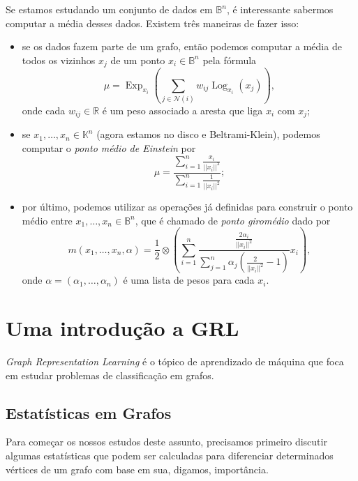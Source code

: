 \documentclass{article}
\DeclareMathOperator{\Exp}{Exp}
\DeclareMathOperator{\Log}{Log}
\begin{document}
Se estamos estudando um conjunto de dados em $\mathbb{B}^n$, é interessante sabermos computar a média desses dados. Existem três maneiras de fazer isso: \begin{itemize}
    \item se os dados fazem parte de um grafo, então podemos computar a média de todos os vizinhos $x_j$ de um ponto $x_i \in \mathbb{B}^n$ pela fórmula \begin{equation}
        \mu = \Exp_{x_i}\left(\sum_{j \in \mathcal{N}(i)} w_{ij} \Log_{x_i}(x_j)\right),
    \end{equation} onde cada $w_{ij} \in \mathbb{R}$ é um peso associado a aresta que liga $x_i$ com $x_j$;

    \item se $x_1, \dots, x_n \in \mathbb{K}^n$ (agora estamos no disco e Beltrami-Klein), podemos computar o \textit{ponto médio de Einstein} por \begin{equation}
        \mu = \frac{\sum_{i = 1}^n \frac{x_i}{||x_i||^2}}{\sum_{i = 1}^n \frac{1}{||x_i||^2}};
    \end{equation}

    \item por último, podemos utilizar as operações já definidas para construir o ponto médio entre $x_1, \dots, x_n \in \mathbb{B}^n$, que é chamado de \textit{ponto giromédio} dado por \begin{equation}
        m(x_1, \dots, x_n, \alpha) = \frac{1}{2} \otimes \left(\sum_{i = 1}^n \frac{\frac{2\alpha_i}{||x_i||^2}}{\sum_{j = 1}^n \alpha_j\left(\frac{2}{||x_i||^2} - 1\right)}x_i\right),
    \end{equation} onde $\alpha = (\alpha_1, \dots, \alpha_n)$ é uma lista de pesos para cada $x_i$.
\end{itemize}

\section{Uma introdução a GRL}

\textit{Graph Representation Learning} é o tópico de aprendizado de máquina que foca em estudar problemas de classificação em grafos.

\subsection{Estatísticas em Grafos}

Para começar os nossos estudos deste assunto, precisamos primeiro discutir algumas estatísticas que podem ser calculadas para diferenciar determinados vértices de um grafo com base em sua, digamos, importância.
\end{document}

